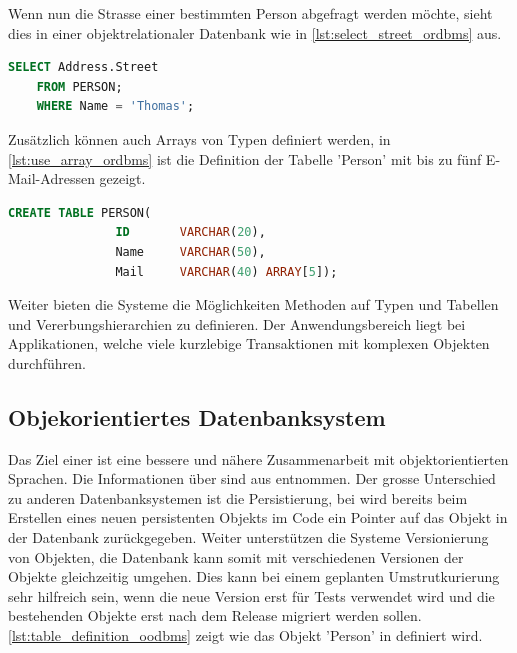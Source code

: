 Wenn nun die Strasse einer bestimmten Person abgefragt werden möchte, sieht dies in einer objektrelationaler Datenbank wie in \autoref{lst:select_street_ordbms} aus.

\begin{lstlisting}[language=SQL, caption=Abfrage in objektrelationalem Datenbanksystem, label=lst:select_street_ordbms]  
    SELECT Address.Street
    FROM PERSON;
    WHERE Name = 'Thomas';
\end{lstlisting}

Zusätzlich können auch Arrays von Typen definiert werden, in \autoref{lst:use_array_ordbms} ist die Definition der Tabelle 'Person' mit 
bis zu fünf E-Mail-Adressen gezeigt.

\begin{lstlisting}[language=SQL, caption=Verwendung von Array in objektrelationalem Datenbanksystem, label=lst:use_array_ordbms]  
    CREATE TABLE PERSON(
               ID       VARCHAR(20),
               Name     VARCHAR(50),
               Mail     VARCHAR(40) ARRAY[5]);
\end{lstlisting}

Weiter bieten die Systeme die Möglichkeiten Methoden auf Typen und Tabellen und Vererbungshierarchien zu definieren. Der Anwendungsbereich 
liegt bei Applikationen, welche viele kurzlebige Transaktionen mit komplexen Objekten durchführen.

\subsection{Objekorientiertes Datenbanksystem}\label{object_db}
Das Ziel einer  ist eine bessere und nähere Zusammenarbeit mit objektorientierten Sprachen.
Die Informationen über  sind aus \cite{limited2010introduction} entnommen. Der grosse Unterschied zu anderen Datenbanksystemen
ist die Persistierung, bei  wird bereits beim Erstellen eines neuen persistenten Objekts im Code ein Pointer auf das Objekt in der Datenbank zurückgegeben. 
Weiter unterstützen die Systeme Versionierung von Objekten, die Datenbank kann somit mit verschiedenen Versionen der Objekte gleichzeitig umgehen. 
Dies kann bei einem geplanten Umstrutkurierung sehr hilfreich sein, wenn die neue Version erst für Tests verwendet wird und die bestehenden Objekte erst nach dem 
Release migriert werden sollen. \autoref{lst:table_definition_oodbms} zeigt wie das Objekt 'Person' in  definiert wird.

